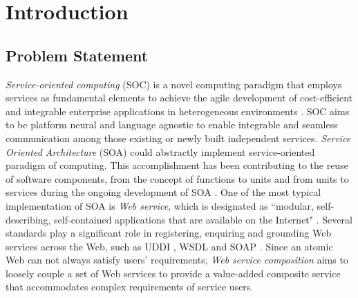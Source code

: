 \chapter{Introduction}\label{C:intro}

\section{Problem Statement}
\emph{Service-oriented computing} (SOC) is a novel computing paradigm that employs services as fundamental elements to achieve the agile development of cost-efficient and integrable enterprise applications in heterogeneous environments \cite{papazoglou2003service, papazoglou2006p}. SOC aims to be platform neural and language agnostic to enable integrable and seamless communication among those existing or newly built independent services. \emph{Service Oriented Architecture} (SOA)  could abstractly implement service-oriented paradigm of computing. This accomplishment has been contributing to the reuse of software components, from the concept of functions to units and from units to services during the ongoing development of SOA \cite{booth2004web, overdick2007resource}. One of the most typical implementation of SOA is \emph{Web service}, which is designated as ``modular, self-describing, self-contained applications that are available on the Internet" \cite{curbera2001web}. Several standards play a significant role in registering, enquiring and grounding Web services across the Web, such as UDDI \cite{curbera2002unraveling}, WSDL \cite{lausen2007semantic} and SOAP \cite{fensel2011semantic}. Since an atomic Web can not always satisfy users' requirements, \emph{Web service composition} aims to loosely couple a set of Web services to provide a value-added composite service that accommodates complex requirements of service users. 

